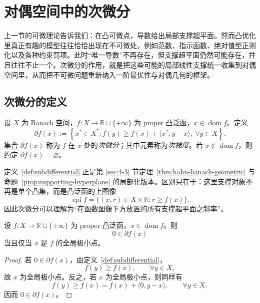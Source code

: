 \section{对偶空间中的次微分}

\label{sec:5-3}

上一节的可微理论告诉我们：在凸可微点，导数给出局部支撑超平面。然而凸优化里真正有趣的模型往往恰恰出现在不可微处，例如范数、指示函数、绝对值型正则化以及各种约束罚项。此时“唯一导数”不再存在，但支撑超平面仍然可能存在，并且往往不止一个。次微分的作用，就是把这些可能的局部线性支撑统一收集到对偶空间里，从而把不可微问题重新纳入一阶最优性与对偶几何的框架。

\subsection{次微分的定义}

\begin{definition}[次微分]\label{def:subdifferential}
设 $X$ 为 Banach 空间，$f\colon X\to \mathbb R\cup\{+\infty\}$ 为 proper 凸泛函，$x\in \operatorname{dom}f$。定义
\[
\partial f(x)
:=\left\{x^\ast\in X^\ast:
f(y)\ge f(x)+\langle x^\ast,y-x\rangle,\ \forall y\in X\right\}.
\]
集合 $\partial f(x)$ 称为 $f$ 在 $x$ 处的\emph{次微分}；其中元素称为\emph{次梯度}。若 $x\notin \operatorname{dom}f$，则约定 $\partial f(x)=\varnothing$。
\end{definition}

\begin{remark}
定义~\ref{def:subdifferential} 正是第 \ref{sec:4-3} 节定理~\ref{thm:hahn-banach-geometric} 与命题~\ref{prop:supporting-hyperplane} 的局部化版本。区别只在于：这里支撑对象不再是单个凸集，而是凸泛函的上图像
\[
\operatorname{epi}f=\{(x,r)\in X\times\mathbb R:r\ge f(x)\}.
\]
因此次微分可以理解为“在函数图像下方放置的所有支撑超平面之斜率”。
\end{remark}

\begin{proposition}[次梯度最优性条件]\label{prop:subgradient-optimality}
设 $f\colon X\to \mathbb R\cup\{+\infty\}$ 为 proper 凸泛函，$x\in \operatorname{dom}f$。则
\[
0\in \partial f(x)
\]
当且仅当 $x$ 是 $f$ 的全局极小点。
\end{proposition}

\begin{proof}
若 $0\in \partial f(x)$，由定义~\ref{def:subdifferential}，
\[
f(y)\ge f(x),\qquad \forall y\in X,
\]
故 $x$ 为全局极小点。反之，若 $x$ 为全局极小点，则同样有
\[
f(y)\ge f(x)=f(x)+\langle 0,y-x\rangle,\qquad \forall y\in X,
\]
因而 $0\in\partial f(x)$。
\end{proof}

